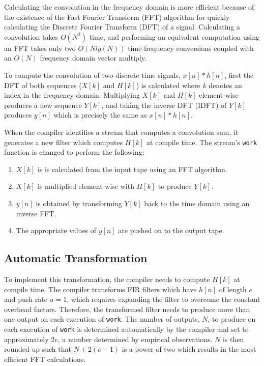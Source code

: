 Calculating the convolution in the frequency domain is more efficient
because of the existence of the Fast Fourier Transform (FFT) algorithm
for quickly calculating the Discrete Fourier Transform (DFT) of a signal.
Calculating a convolution takes $O(N^2)$ time, and performing an equivalent
computation using an FFT takes only two $O(N lg(N))$
time-frequency conversions coupled with an $O(N)$ frequency domain
vector multiply.


To compute the convolution of two discrete time signals, $x[n]*h[n]$,
first the DFT of both sequences ($X[k]$ and $H[k]$) is calculated where
$k$ denotes an index in the frequency domain.
Multiplying $X[k]$ and $H[k]$ element-wise produces a new
sequence $Y[k]$, and taking the inverse DFT (IDFT) of $Y[k]$ produces
$y[n]$ which is precisely the same as $x[n]*h[n]$.

When the compiler identifies a stream that computes a convolution sum,
it generates a new filter which computes $H[k]$ at compile time. 
The stream's {\tt work} function is changed to perform the following:
\begin{enumerate}
\item $X[k]$ is is calculated from the input tape using an FFT algorithm. 
\vspace{-6pt}
\item $X[k]$ is multiplied element-wise with $H[k]$ to produce $Y[k]$. 
\vspace{-6pt}
\item $y[n]$ is obtained by transforming $Y[k]$ back to the time domain using an inverse FFT.
\vspace{-6pt}
\item The appropriate values of $y[n]$ are pushed on to the output tape.
\end{enumerate} 

\subsection{Automatic Transformation}

To implement this transformation, the compiler needs to compute $H[k]$ at
compile time. The compiler transforms FIR filters 
which have $h[n]$ of length $e$ and push rate $u=1$, which 
requires expanding the filter to overcome the constant overhead factors.
Therefore, the transformed filter needs to produce more than one output on each
execution of {\tt work}. The number of outputs, $N$, to produce on each 
execution of {\tt work} is determined automatically by the compiler and set to 
approximately $2e$, a number determined by empirical observations. $N$ is then rounded 
up such that $N+2(e-1)$ is a power of two which results in the most efficient 
FFT calculations.

